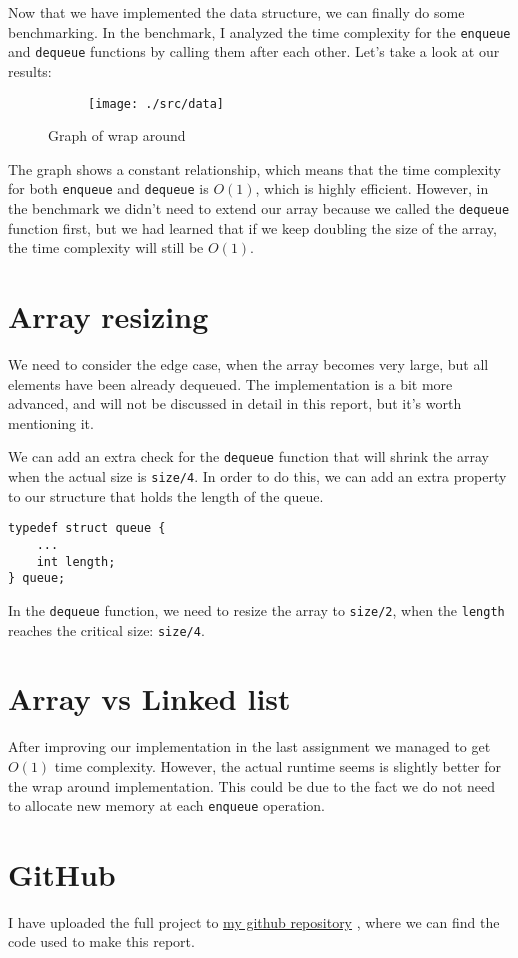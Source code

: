 \documentclass[a4paper,11pt]{article}
\newcommand{\underlinehref}[2]{%
    \href{#1}{\ul{#2}}%
}
\begin{document}
    Now that we have implemented the data structure, we can finally do some benchmarking.
    In the benchmark, I analyzed the time complexity for the {\tt enqueue} and {\tt dequeue} functions by calling them after each other.
    Let's take a look at our results:

    \begin{figure}[H]
        \centering
        \begin{subfigure}[b]{.5\textwidth}
            \centering
            \texttt{[image: ./src/data]} %
        \end{subfigure}
        \caption{Graph of wrap around}
        \label{fig:graph_1}
    \end{figure}

    The graph shows a constant relationship, which means that the time complexity for both {\tt enqueue} and {\tt dequeue} is $O(1)$, which is highly efficient.
    However, in the benchmark we didn't need to extend our array because we called the {\tt dequeue} function first, but we had learned that if we keep doubling the size of the array, the time complexity will still be $O(1)$.

    \section*{Array resizing}

    We need to consider the edge case, when the array becomes very large, but all elements have been already dequeued.
    The implementation is a bit more advanced, and will not be discussed in detail in this report, but it's worth mentioning it.

    We can add an extra check for the {\tt dequeue} function that will shrink the array when the actual size is {\tt size/4}.
    In order to do this, we can add an extra property to our structure that holds the length of the queue.

    \begin{verbatim}
typedef struct queue {
    ...
    int length;
} queue;
    \end{verbatim}

    In the {\tt dequeue} function, we need to resize the array to {\tt size/2}, when the {\tt length} reaches the critical size: {\tt size/4}.

    \section*{Array vs Linked list}

    After improving our implementation in the last assignment we managed to get $O(1)$ time complexity.
    However, the actual runtime seems is slightly better for the wrap around implementation.
    This could be due to the fact we do not need to allocate new memory at each {\tt enqueue} operation.

    \section*{GitHub}
    I have uploaded the full project to \underlinehref{https://github.com/peterherczku/ID1021/tree/main/assignment-6-D}{my github repository}, where we can find the code used to make this report.
\end{document}
